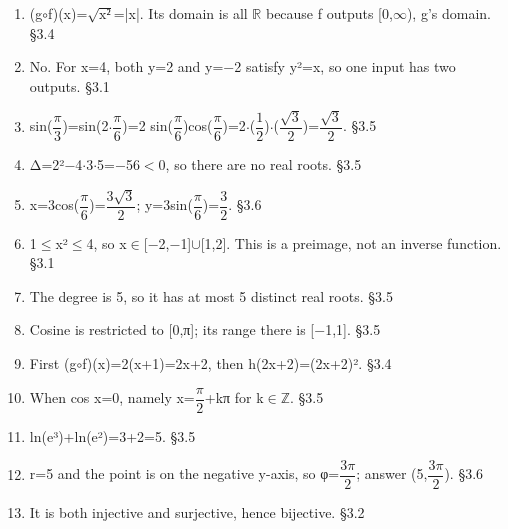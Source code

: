 \documentclass[11pt]{article}
\begin{document}
\begin{keepsection}
\begin{enumerate}
\item (g\ensuremath{\circ}f)(x)=\ensuremath{\sqrt{\mathrm{x}²}}=|x|. Its domain is all \ensuremath{\mathbb{R}} because f outputs [0,\ensuremath{\infty}), g’s domain. \hfill{\small\color{FAUblue}§3.4}
\item No. For x=4, both y=2 and y=\ensuremath{-}2 satisfy y²=x, so one input has two outputs. \hfill{\small\color{FAUblue}§3.1}
\item sin({\small\ensuremath{\dfrac{π}{3}}})=sin(2\ensuremath{\cdot}{\small\ensuremath{\dfrac{π}{6}}})=2 sin({\small\ensuremath{\dfrac{π}{6}}})cos({\small\ensuremath{\dfrac{π}{6}}})=2\ensuremath{\cdot}({\small\ensuremath{\dfrac{1}{2}}})\ensuremath{\cdot}({\small\ensuremath{\dfrac{\sqrt{3}}{2}}})={\small\ensuremath{\dfrac{\sqrt{3}}{2}}}. \hfill{\small\color{FAUblue}§3.5}
\item Δ=2²\ensuremath{-}4\ensuremath{\cdot}3\ensuremath{\cdot}5=\ensuremath{-}56\ensuremath{<}0, so there are no real roots. \hfill{\small\color{FAUblue}§3.5}
\item x=3cos({\small\ensuremath{\dfrac{π}{6}}})={\small\ensuremath{\dfrac{3\sqrt{3}}{2}}}; y=3sin({\small\ensuremath{\dfrac{π}{6}}})={\small\ensuremath{\dfrac{3}{2}}}. \hfill{\small\color{FAUblue}§3.6}
\item 1\ensuremath{\leq}x²\ensuremath{\leq}4, so x\ensuremath{\in}[\ensuremath{-}2,\ensuremath{-}1]\ensuremath{\cup}[1,2]. This is a preimage, not an inverse function. \hfill{\small\color{FAUblue}§3.1}
\item The degree is 5, so it has at most 5 distinct real roots. \hfill{\small\color{FAUblue}§3.5}
\item Cosine is restricted to [0,π]; its range there is [\ensuremath{-}1,1]. \hfill{\small\color{FAUblue}§3.5}
\item First (g\ensuremath{\circ}f)(x)=2(x+1)=2x+2, then h(2x+2)=(2x+2)². \hfill{\small\color{FAUblue}§3.4}
\item When cos x=0, namely x={\small\ensuremath{\dfrac{π}{2}}}+kπ for k\ensuremath{\in}\ensuremath{\mathbb{Z}}. \hfill{\small\color{FAUblue}§3.5}
\item ln(e³)+ln(e²)=3+2=5. \hfill{\small\color{FAUblue}§3.5}
\item r=5 and the point is on the negative y-axis, so φ={\small\ensuremath{\dfrac{3π}{2}}}; answer (5,{\small\ensuremath{\dfrac{3π}{2}}}). \hfill{\small\color{FAUblue}§3.6}
\item It is both injective and surjective, hence bijective. \hfill{\small\color{FAUblue}§3.2}
\end{enumerate}

\end{keepsection}
\end{document}
